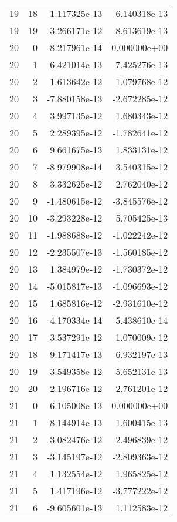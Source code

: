 \begin{tabular}{rrrr}
  19 &   18 &  1.117325e-13 &  6.140318e-13 \\
  19 &   19 & -3.266171e-12 & -8.613619e-13 \\
  20 &    0 &  8.217961e-14 &  0.000000e+00 \\
  20 &    1 &  6.421014e-13 & -7.425276e-13 \\
  20 &    2 &  1.613642e-12 &  1.079768e-12 \\
  20 &    3 & -7.880158e-13 & -2.672285e-12 \\
  20 &    4 &  3.997135e-12 &  1.680343e-12 \\
  20 &    5 &  2.289395e-12 & -1.782641e-12 \\
  20 &    6 &  9.661675e-13 &  1.833131e-12 \\
  20 &    7 & -8.979908e-14 &  3.540315e-12 \\
  20 &    8 &  3.332625e-12 &  2.762040e-12 \\
  20 &    9 & -1.480615e-12 & -3.845576e-12 \\
  20 &   10 & -3.293228e-12 &  5.705425e-13 \\
  20 &   11 & -1.988688e-12 & -1.022242e-12 \\
  20 &   12 & -2.235507e-13 & -1.560185e-12 \\
  20 &   13 &  1.384979e-12 & -1.730372e-12 \\
  20 &   14 & -5.015817e-13 & -1.096693e-12 \\
  20 &   15 &  1.685816e-12 & -2.931610e-12 \\
  20 &   16 & -4.170334e-14 & -5.438610e-14 \\
  20 &   17 &  3.537291e-12 & -1.070009e-12 \\
  20 &   18 & -9.171417e-13 &  6.932197e-13 \\
  20 &   19 &  3.549358e-12 &  5.652131e-13 \\
  20 &   20 & -2.196716e-12 &  2.761201e-12 \\
  21 &    0 &  6.105008e-13 &  0.000000e+00 \\
  21 &    1 & -8.144914e-13 &  1.600415e-13 \\
  21 &    2 &  3.082476e-12 &  2.496839e-12 \\
  21 &    3 & -3.145197e-12 & -2.809363e-12 \\
  21 &    4 &  1.132554e-12 &  1.965825e-12 \\
  21 &    5 &  1.417196e-12 & -3.777222e-12 \\
  21 &    6 & -9.605601e-13 &  1.112583e-12 \\

\end{tabular}
